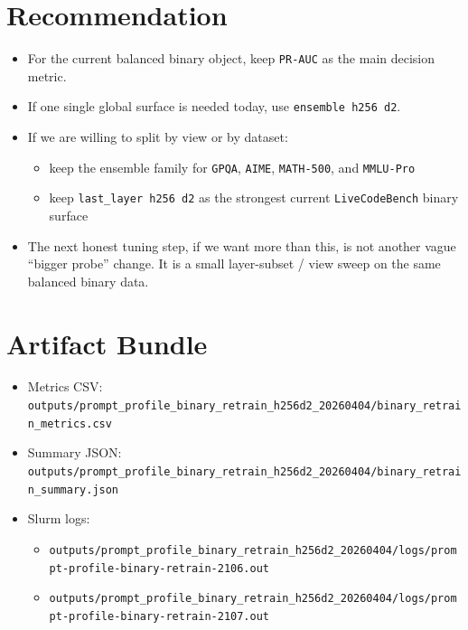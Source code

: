 \documentclass[11pt]{article}
\begin{document}
\section*{Recommendation}
\begin{itemize}[leftmargin=1.5em]
\item For the current balanced binary object, keep \texttt{PR-AUC} as the main decision metric.
\item If one single global surface is needed today, use \texttt{ensemble h256 d2}.
\item If we are willing to split by view or by dataset:
  \begin{itemize}[leftmargin=1.5em]
  \item keep the ensemble family for \texttt{GPQA}, \texttt{AIME}, \texttt{MATH-500}, and \texttt{MMLU-Pro}
  \item keep \texttt{last\_layer h256 d2} as the strongest current \texttt{LiveCodeBench} binary surface
  \end{itemize}
\item The next honest tuning step, if we want more than this, is not another vague ``bigger probe'' change. It is a small layer-subset / view sweep on the same balanced binary data.
\end{itemize}

\section*{Artifact Bundle}
\begin{itemize}[leftmargin=1.5em]
\item Metrics CSV: \texttt{outputs/prompt\_profile\_binary\_retrain\_h256d2\_20260404/binary\_retrain\_metrics.csv}
\item Summary JSON: \texttt{outputs/prompt\_profile\_binary\_retrain\_h256d2\_20260404/binary\_retrain\_summary.json}
\item Slurm logs:
  \begin{itemize}[leftmargin=1.5em]
  \item \texttt{outputs/prompt\_profile\_binary\_retrain\_h256d2\_20260404/logs/prompt-profile-binary-retrain-2106.out}
  \item \texttt{outputs/prompt\_profile\_binary\_retrain\_h256d2\_20260404/logs/prompt-profile-binary-retrain-2107.out}
  \end{itemize}
\end{itemize}
\end{document}
